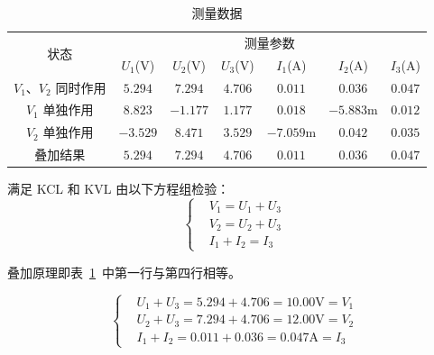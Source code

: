 \documentclass[12pt]{SEU-Circuit-Report}
\begin{document}
            \begin{table}[htbp]
                \centering
                \begin{tabular}{ccccccc}
                    \toprule
                    \multirow{2}[4]{*}{状态} & \multicolumn{6}{c}{测量参数} \\
                    \cmidrule{2-7}\multicolumn{1}{c}{} & \multicolumn{1}{c}{$U_1$(V)} & \multicolumn{1}{c}{$U_2$(V)} & \multicolumn{1}{c}{$U_3$(V)} & \multicolumn{1}{c}{$I_1$(A)} & \multicolumn{1}{c}{$I_2$(A)} & \multicolumn{1}{c}{$I_3$(A)} \\
                    \midrule
                    $V_1$、$V_2$ 同时作用 & $5.294$ & $7.294$ & $4.706$ & $0.011$ & $0.036$ & $0.047$ \\
                    $V_1$ 单独作用 & $8.823$ & $-1.177$ & $1.177$ & $0.018$ & $-5.883\mathrm{m}$ & $0.012$ \\
                    $V_2$ 单独作用 & $-3.529$ & $8.471$ & $3.529$ & $-7.059\mathrm{m}$ & $0.042$ & $0.035$ \\
                    叠加结果 & $5.294$ & $7.294$ & $4.706$ & $0.011$ & $0.036$ & $0.047$ \\
                    \bottomrule
                \end{tabular}
                \caption{测量数据}
                \label{tab:1data}
            \end{table}

            \expexpect
            
            满足 KCL 和 KVL 由以下方程组检验：
            \begin{equation}\label{eq:kcl_kvl_test}
                \left\{
                    \begin{aligned}
                        & V_1=U_1+U_3 \\
                        & V_2=U_2+U_3 \\
                        & I_1+I_2=I_3
                    \end{aligned}
                \right.
            \end{equation}
                
            叠加原理即表~\ref{tab:1data}~中第一行与第四行相等。
                
            \expanalyze

            \begin{equation}\label{eq:kcl_kvl_result}
                \left\{
                    \begin{aligned}
                        & U_1+U_3=5.294+4.706=10.00\mathrm{V}=V_1 \\
                        & U_2+U_3=7.294+4.706=12.00\mathrm{V}=V_2 \\
                        & I_1+I_2=0.011+0.036=0.047\mathrm{A}=I_3
                    \end{aligned}
                \right.
            \end{equation}
\end{document}
